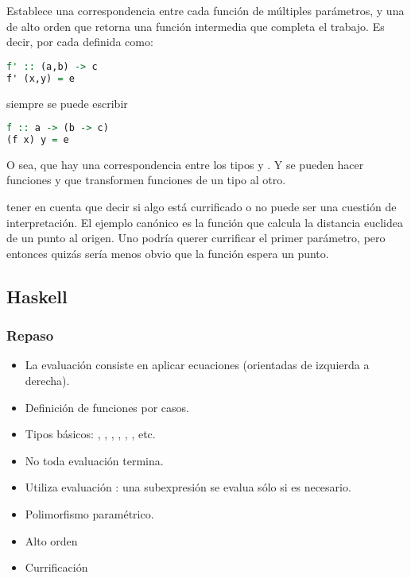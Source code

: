 Establece una correspondencia entre cada función de múltiples parámetros, y una de alto orden que retorna una función intermedia que completa el trabajo. Es decir, por cada  definida como:
\begin{lstlisting}[language=Haskell]
f' :: (a,b) -> c
f' (x,y) = e
\end{lstlisting}

siempre se puede escribir

\begin{lstlisting}[language=Haskell]
f :: a -> (b -> c)
(f x) y = e
\end{lstlisting}

O sea, que hay una correspondencia entre los tipos  y . Y se pueden hacer funciones  y  que transformen funciones de un tipo al otro.

 tener en cuenta que decir si algo está currificado o no puede ser una cuestión de interpretación. El ejemplo canónico es la función  que calcula la distancia euclidea de un punto al origen. Uno podría querer currificar el primer parámetro, pero entonces quizás sería menos obvio que la función espera un punto.

\subsection{Haskell}

\subsubsection{Repaso}

\begin{itemize}
  \item La evaluación consiste en aplicar ecuaciones (orientadas de izquierda a derecha).
  \item Definición de funciones por casos.
  \item Tipos básicos: , , , , , , etc.
  \item No toda evaluación termina.
  \item Utiliza evaluación : una subexpresión se evalua sólo si es necesario.
  \item Polimorfismo paramétrico.
  \item Alto orden
  \item Currificación
\end{itemize}

